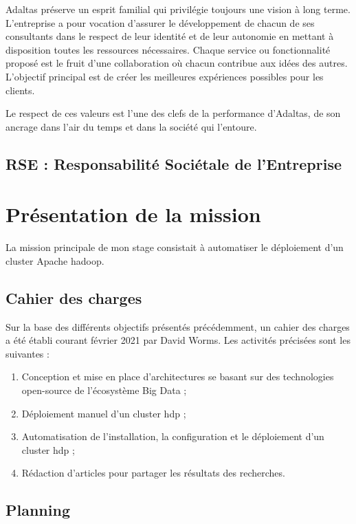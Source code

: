\documentclass[12pt, french]{report}
\begin{document}
Adaltas préserve un esprit familial qui privilégie toujours une vision à long terme. L'entreprise a pour vocation d’assurer le développement de chacun de ses consultants dans le respect de leur identité et de leur autonomie en mettant à disposition toutes les ressources nécessaires. Chaque service ou fonctionnalité proposé est le fruit d’une collaboration où chacun contribue aux idées des autres. L'objectif principal est de créer les meilleures expériences possibles pour les clients.

Le respect de ces valeurs est l’une des clefs de la performance d'Adaltas, de son ancrage dans l’air du temps et dans la société qui l'entoure.

\section{RSE : Responsabilité Sociétale de l’Entreprise}



\chapter{Présentation de la mission}

La mission principale de mon stage consistait à automatiser le déploiement d'un cluster Apache \gls{hadoop}.

\section{Cahier des charges}

Sur la base des différents objectifs présentés précédemment, un cahier des charges a été établi courant février 2021 par David Worms. Les activités précisées sont les suivantes : 

\begin{enumerate}
  \item Conception et mise en place d’architectures se basant sur des technologies open-source de l'écosystème Big Data ;
  \item Déploiement manuel d'un cluster \gls{hdp} ;
  \item Automatisation de l'installation, la configuration et le déploiement d'un cluster \gls{hdp} ;
  \item Rédaction d’articles pour partager les résultats des recherches.
\end{enumerate}

\section{Planning}
\end{document}
